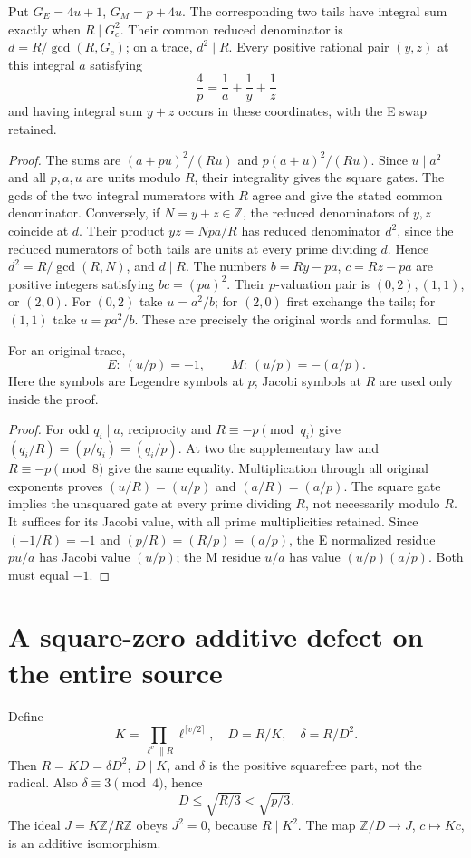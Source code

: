\begin{lemma}\label{lem:trace}
Put $G_E=4u+1$, $G_M=p+4u$. The corresponding two tails have integral sum
exactly when $R\mid G_c^2$. Their common reduced denominator is
$d=R/\gcd(R,G_c)$; on a trace, $d^2\mid R$.
Every positive rational pair $(y,z)$ at this integral $a$ satisfying
\[
 \frac4p=\frac1a+\frac1y+\frac1z
\]
and having integral sum $y+z$ occurs in these coordinates, with the E swap
retained.
\end{lemma}
\begin{proof}
The sums are $(a+pu)^2/(Ru)$ and $p(a+u)^2/(Ru)$. Since $u\mid a^2$ and
all $p,a,u$ are units modulo $R$, their integrality gives the square gates.
The gcds of the two integral numerators with $R$ agree and give the stated
common denominator.
Conversely, if $N=y+z\in\mathbb Z$, the reduced denominators of $y,z$ coincide
at $d$. Their product $yz=Npa/R$ has reduced denominator $d^2$, since the
reduced numerators of both tails are units at every prime dividing $d$.
Hence $d^2=R/\gcd(R,N)$, and $d\mid R$.
The numbers $b=Ry-pa$, $c=Rz-pa$ are positive integers satisfying
$bc=(pa)^2$. Their $p$-valuation pair is $(0,2),(1,1)$, or $(2,0)$.
For $(0,2)$ take $u=a^2/b$; for $(2,0)$ first exchange the tails; for
$(1,1)$ take $u=pa^2/b$. These are precisely the original words and formulas.
\end{proof}

\begin{lemma}\label{lem:char}
For an original trace,
\[
 E:\ (u/p)=-1,\qquad M:\ (u/p)=-(a/p).
\]
Here the symbols are Legendre symbols at $p$; Jacobi symbols at $R$ are used
only inside the proof.
\end{lemma}
\begin{proof}
For odd $q_i\mid a$, reciprocity and $R\equiv-p\pmod{q_i}$ give
$(q_i/R)=(p/q_i)=(q_i/p)$. At two the supplementary law and
$R\equiv-p\pmod8$ give the same equality. Multiplication through all original
exponents proves $(u/R)=(u/p)$ and $(a/R)=(a/p)$.
The square gate implies the unsquared gate at every prime dividing $R$, not
necessarily modulo $R$. It suffices for its Jacobi value, with all prime
multiplicities retained. Since $(-1/R)=-1$ and
$(p/R)=(R/p)=(a/p)$, the E normalized residue $pu/a$ has Jacobi value
$(u/p)$; the M residue $u/a$ has value $(u/p)(a/p)$. Both must equal $-1$.
\end{proof}

\section{A square-zero additive defect on the entire source}\label{sec:defect}
Define
\[
 K=\prod_{\ell^v\parallel R}\ell^{\lceil v/2\rceil},\quad
 D=R/K,\quad \delta=R/D^2.
\]
Then $R=KD=\delta D^2$, $D\mid K$, and $\delta$ is the positive squarefree
part, not the radical. Also $\delta\equiv3\pmod4$, hence
\begin{equation}\label{eq:D-bound}
 D\le\sqrt{R/3}<\sqrt{p/3}.
\end{equation}
The ideal $J=K\mathbb Z/R\mathbb Z$ obeys $J^2=0$, because $R\mid K^2$.
The map $\mathbb Z/D\to J$, $c\mapsto Kc$, is an additive isomorphism.

